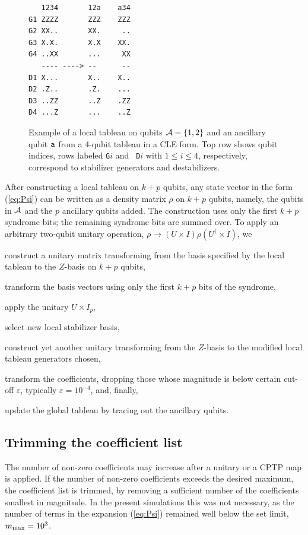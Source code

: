 \begin{figure}[htbp]
  \centering
    \begin{minipage}[c]{3in}
\begin{verbatim}
   1234       12a    a34
G1 ZZZZ       ZZZ    ZZZ
G2 XX..       XX.     ..
G3 X.X.       X.X    XX.
G4 ..XX       ...     XX
   ---- ----> --      -- 
D1 X...       X..    X..
D2 .Z..       .Z.    ...
D3 ..ZZ       ..Z    .ZZ
D4 ...Z       ...    ..Z
\end{verbatim}
  \end{minipage}%
  \caption{Example of a local tableau on qubits ${\cal A}=\{1,2\}$ and
    an ancillary qubit ${\tt a}$ from a 4-qubit tableau in a CLE form.
    Top row shows qubit indices, rows labeled {\tt G}$i$ and {\tt
      D}$i$ with $1\le i\le 4$, respectively, correspond to stabilizer
    generators and destabilizers.}  
\label{fig:clef-decomposition}
\end{figure}
After constructing a local tableau on $k+p$ qubits, any state vector
in the form (\ref{eq:Psi}) can be written as a density matrix $\rho$
on $k+p$ qubits, namely, the qubits in ${\cal A}$ and the $p$
ancillary qubits added.  The construction uses only the first $k+p$
syndrome bits; the remaining syndrome bits are summed over.  To
apply an arbitrary two-qubit unitary operation,
$\rho\to (U\times I)\rho(U^\dagger\times I)$, we
\begin{enumerate*}[label=(\alph*)]
\item construct a unitary matrix transforming from the basis specified
  by the local tableau to the $Z$-basis on $k+p$ qubits,
\item transform the
basis vectors using only the first $k+p$ bits of the syndrome, 
\item apply the unitary $U\times I_p$, 
\item select new local stabilizer
  basis, 
\item construct yet another unitary transforming from the $Z$-basis
  to the modified local tableau generators chosen, 
\item transform the coefficients, dropping those whose magnitude is
  below certain cut-off $\varepsilon$, typically
  $\varepsilon=10^{-4}$, and, finally,
\item update the global tableau by tracing out the ancillary qubits.
\end{enumerate*}
\subsection{Trimming the coefficient list}
The number of non-zero coefficients may increase after a unitary or a
CPTP map is applied.  If the number of non-zero coefficients exceeds
the desired maximum, the coefficient list is trimmed, by removing a
sufficient number of the coefficients smallest in magnitude.  In the
present simulations this was not necessary, as the number of terms in
the expansion (\ref{eq:Psi}) remained well below the set limit,
$m_{\rm max}=10^3$.

